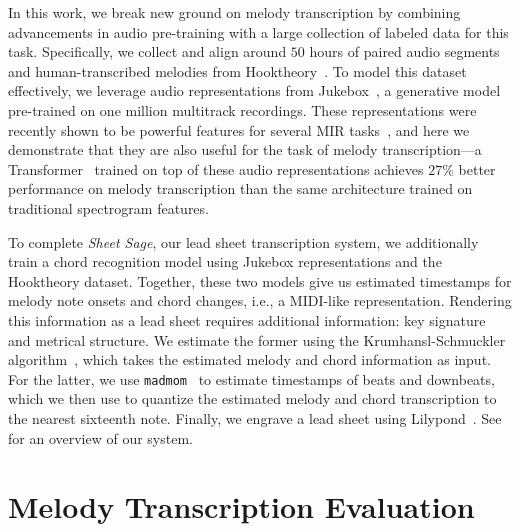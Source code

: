 \documentclass{article}
\begin{document}
In this work, we break new ground on melody transcription by combining advancements in audio pre-training with a large collection of labeled data for this task. 
Specifically, we collect and align around $50$ hours of paired audio segments and human-transcribed melodies from Hooktheory~\cite{hooktheory}. 
To model this dataset effectively, 
we leverage audio representations from Jukebox~\cite{dhariwal2020jukebox}, 
a generative model pre-trained on one million multitrack recordings. 
These representations were recently shown to be powerful features for several MIR tasks~\cite{castellon2021calm}, 
and here we demonstrate that they are also useful for the task of melody transcription---a Transformer~\cite{vaswani2017attention} trained on top of these audio representations achieves
$27\%$ 
better performance on melody transcription 
than the same architecture trained on traditional spectrogram features.

To complete \emph{Sheet Sage}, 
our lead sheet transcription system, 
we additionally train a chord recognition model using Jukebox representations and the Hooktheory dataset.
Together, these two models give us estimated timestamps for melody note onsets and chord changes, i.e., a MIDI-like representation. 
Rendering this information as a lead sheet requires additional information: key signature and metrical structure. 
We estimate the former using the Krumhansl-Schmuckler algorithm~\cite{krumhansl1990cognitive,temperley1999key}, which takes the estimated melody and chord information as input. 
For the latter, we use \texttt{madmom}~\cite{bock2016madmom,bock2016joint} to estimate timestamps of beats and downbeats, 
which we then use to quantize the estimated melody and chord transcription to the nearest sixteenth note. 
Finally, we engrave a lead sheet using Lilypond~\cite{nienhuys2003lilypond}. 
See~ for an overview of our system.

\section{Melody Transcription Evaluation}

\newcommand{\tabquantrow}[7]{ #7 & #1 & #2 & #3 \\}
\end{document}
